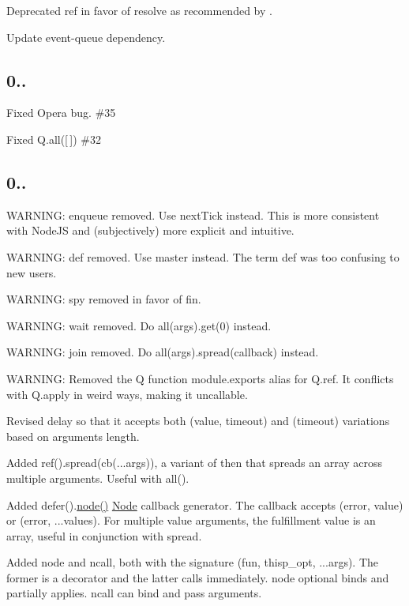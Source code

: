 \begin{DoxyItemize}
\item Deprecated {\ttfamily ref} in favor of {\ttfamily resolve} as recommended by .
\item Update event-\/queue dependency.
\end{DoxyItemize}

\subsection*{0..}


\begin{DoxyItemize}
\item Fixed Opera bug. \#35 
\item Fixed {\ttfamily Q.\+all(\mbox{[}$\,$\mbox{]})} \#32 
\end{DoxyItemize}

\subsection*{0..}


\begin{DoxyItemize}
\item W\+A\+R\+N\+I\+NG\+: {\ttfamily enqueue} removed. Use {\ttfamily next\+Tick} instead. This is more consistent with Node\+JS and (subjectively) more explicit and intuitive.
\item W\+A\+R\+N\+I\+NG\+: {\ttfamily def} removed. Use {\ttfamily master} instead. The term {\ttfamily def} was too confusing to new users.
\item W\+A\+R\+N\+I\+NG\+: {\ttfamily spy} removed in favor of {\ttfamily fin}.
\item W\+A\+R\+N\+I\+NG\+: {\ttfamily wait} removed. Do {\ttfamily all(args).get(0)} instead.
\item W\+A\+R\+N\+I\+NG\+: {\ttfamily join} removed. Do {\ttfamily all(args).spread(callback)} instead.
\item W\+A\+R\+N\+I\+NG\+: Removed the {\ttfamily Q} function module.\+exports alias for {\ttfamily Q.\+ref}. It conflicts with {\ttfamily Q.\+apply} in weird ways, making it uncallable.
\item Revised {\ttfamily delay} so that it accepts both {\ttfamily (value, timeout)} and {\ttfamily (timeout)} variations based on arguments length.
\item Added {\ttfamily ref().spread(cb(...args))}, a variant of {\ttfamily then} that spreads an array across multiple arguments. Useful with {\ttfamily all()}.
\item Added {\ttfamily defer().\mbox{\hyperlink{structnode}{node()}}} \mbox{\hyperlink{classNode}{Node}} callback generator. The callback accepts {\ttfamily (error, value)} or {\ttfamily (error, ...values)}. For multiple value arguments, the fulfillment value is an array, useful in conjunction with {\ttfamily spread}.
\item Added {\ttfamily node} and {\ttfamily ncall}, both with the signature {\ttfamily (fun, thisp\+\_\+opt, ...args)}. The former is a decorator and the latter calls immediately. {\ttfamily node} optional binds and partially applies. {\ttfamily ncall} can bind and pass arguments.
\end{DoxyItemize}

